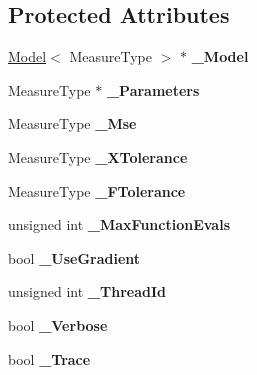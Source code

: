 \subsection*{Protected Attributes}
\begin{DoxyCompactItemize}
\item 
\hyperlink{class_ox_1_1_model}{Model}$<$ Measure\+Type $>$ $\ast$ {\bfseries \+\_\+\+Model}\hypertarget{class_ox_1_1_fitter_ae5a2d2967fb117386a4b73123f188213}{}\label{class_ox_1_1_fitter_ae5a2d2967fb117386a4b73123f188213}

\item 
Measure\+Type $\ast$ {\bfseries \+\_\+\+Parameters}\hypertarget{class_ox_1_1_fitter_a508e5654aaf79dd744ec816d95b7e33c}{}\label{class_ox_1_1_fitter_a508e5654aaf79dd744ec816d95b7e33c}

\item 
Measure\+Type {\bfseries \+\_\+\+Mse}\hypertarget{class_ox_1_1_fitter_a1c5f4e7fa0764489e30685f47fe53190}{}\label{class_ox_1_1_fitter_a1c5f4e7fa0764489e30685f47fe53190}

\item 
Measure\+Type {\bfseries \+\_\+\+X\+Tolerance}\hypertarget{class_ox_1_1_fitter_af91a5ea8fb20072277ddcd64f5537b09}{}\label{class_ox_1_1_fitter_af91a5ea8fb20072277ddcd64f5537b09}

\item 
Measure\+Type {\bfseries \+\_\+\+F\+Tolerance}\hypertarget{class_ox_1_1_fitter_a926f6cf38998f041c31b079e93bf27ab}{}\label{class_ox_1_1_fitter_a926f6cf38998f041c31b079e93bf27ab}

\item 
unsigned int {\bfseries \+\_\+\+Max\+Function\+Evals}\hypertarget{class_ox_1_1_fitter_a3be7ea1c1f19d3f4fb384474e2b1a033}{}\label{class_ox_1_1_fitter_a3be7ea1c1f19d3f4fb384474e2b1a033}

\item 
bool {\bfseries \+\_\+\+Use\+Gradient}\hypertarget{class_ox_1_1_fitter_a34c039e87d52c28b19092535a171264f}{}\label{class_ox_1_1_fitter_a34c039e87d52c28b19092535a171264f}

\item 
unsigned int {\bfseries \+\_\+\+Thread\+Id}\hypertarget{class_ox_1_1_fitter_a0d97d7a9c9fad0349484151464fefe4f}{}\label{class_ox_1_1_fitter_a0d97d7a9c9fad0349484151464fefe4f}

\item 
bool {\bfseries \+\_\+\+Verbose}\hypertarget{class_ox_1_1_fitter_a6457339f5252c85d7c92f20439544975}{}\label{class_ox_1_1_fitter_a6457339f5252c85d7c92f20439544975}

\item 
bool {\bfseries \+\_\+\+Trace}\hypertarget{class_ox_1_1_fitter_a9ba79cb05ecc670254b3e7ddafc519ab}{}\label{class_ox_1_1_fitter_a9ba79cb05ecc670254b3e7ddafc519ab}

\end{DoxyCompactItemize}


